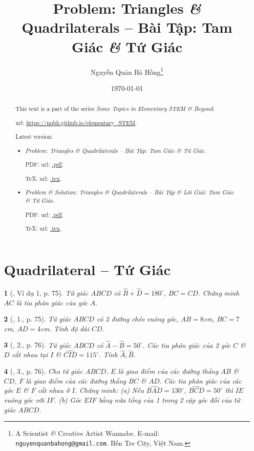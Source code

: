 \documentclass{article}
\title{Problem: Triangles {\it\&} Quadrilaterals -- Bài Tập: Tam Giác {\it\&} Tứ Giác}
\author{Nguyễn Quản Bá Hồng\footnote{A Scientist {\it\&} Creative Artist Wannabe. E-mail: {\tt nguyenquanbahong@gmail.com}. Bến Tre City, Việt Nam.}}
\date{\today}
\newtheorem{baitoan}{}
\begin{document}
\maketitle
\begin{abstract}
	This text is a part of the series {\it Some Topics in Elementary STEM \& Beyond}:
	
	{\sc url}: \url{https://nqbh.github.io/elementary_STEM}.
	
	Latest version:
	\begin{itemize}
		\item {\it Problem: Triangles \& Quadrilaterals -- Bài Tập: Tam Giác \& Tứ Giác}.
		
		PDF: {\sc url}: \url{.pdf}.
		
		\TeX: {\sc url}: \url{.tex}.
		\item {\it Problem \& Solution: Triangles \& Quadrilaterals -- Bài Tập \& Lời Giải: Tam Giác \& Tứ Giác}.
		
		PDF: {\sc url}: \url{.pdf}.
		
		\TeX: {\sc url}: \url{.tex}.
	\end{itemize}
\end{abstract}
\tableofcontents


\section{Quadrilateral -- Tứ Giác}

\begin{baitoan}[\cite{Binh_Toan_8_tap_1}, Ví dụ 1, p. 75]
	Tứ giác $ABCD$ có $\widehat{B} + \widehat{D} = 180^\circ$, $BC = CD$. Chứng minh $AC$ là tia phân giác của góc $A$.
\end{baitoan}

\begin{baitoan}[\cite{Binh_Toan_8_tap_1}, 1., p. 75]
	Tứ giác $ABCD$ có 2 đường chéo vuông góc, $AB = 8${\rm cm}, $BC = 7${\rm cm}, $AD = 4${\rm cm}. Tính độ dài $CD$.
\end{baitoan}

\begin{baitoan}[\cite{Binh_Toan_8_tap_1}, 2., p. 76]
	Tứ giác $ABCD$ có $\widehat{A} - \widehat{B} = 50^\circ$. Các tia phân giác của 2 góc $C$ \& $D$ cắt nhau tại $I$ \& $\widehat{CID} = 115^\circ$. Tính $\widehat{A},\widehat{B}$.
\end{baitoan}

\begin{baitoan}[\cite{Binh_Toan_8_tap_1}, 3., p. 76]
	Cho tứ giác $ABCD$, $E$ là giao điểm của các đường thẳng $AB$ \& $CD$, $F$ là giao điểm của các đường thẳng $BC$ \& $AD$. Các tia phân giác của các góc $E$ \& $F$ cắt nhau ở $I$. Chứng minh: (a) Nếu $\widehat{BAD} = 130^\circ$, $\widehat{BCD} = 50^\circ$ thì $IE$ vuông góc với $IF$. (b) Góc $EIF$ bằng nửa tổng của 1 trong 2 cặp góc đối của tứ giác $ABCD$.
\end{baitoan}
\end{document}
